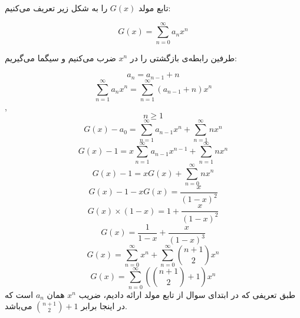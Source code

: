     \p
    تابع مولد $G(x)$ را به شکل زیر تعریف می‌کنیم:
    
    $$G(x) = \sum_{n = 0}^{\infty} a_nx^n$$
    
    طرفین رابطه‌ی بازگشتی را در $x^n$ ضرب می‌کنیم و سیگما می‌گیریم:
    

        $$a_n = a_{n-1} + n$$
        $$\sum_{n = 1}^{\infty} a_nx^n = \sum_{n = 1}^{\infty} (a_{n-1}+n)x^n$$
        ,
        $$ n \geqslant 1 $$
        $$G(x) - a_0 = \sum_{n = 1}^{\infty} a_{n-1}x^n + \sum_{n = 1}^{\infty}nx^n$$
        $$G(x) - 1 = x\sum_{n = 1}^{\infty} a_{n-1}x^{n-1} + \sum_{n = 1}^{\infty}nx^n$$
        $$G(x) - 1 = xG(x) + \sum_{n = 0}^{\infty}nx^n$$
        $$G(x) - 1 - xG(x) = \frac{x}{(1 - x)^2}$$
        $$G(x)\times(1 - x) = 1 + \frac{x}{(1 - x)^2}$$
        $$G(x) = \frac{1}{1 - x} + \frac{x}{(1 - x)^3}$$
        $$G(x) = \sum_{n = 0}^{\infty} x^n + \sum_{n = 0}^{\infty} \binom{n + 1}{2}x^n$$
        $$G(x) = \sum_{n = 0}^{\infty} (\binom{n + 1}{2} + 1)x^n$$
    طبق تعریفی که در ابتدای سوال از تابع مولد ارائه دادیم، ضریب $x^n$ همان $a_n$ است
    که در اینجا برابر
    $\binom{n + 1}{2} + 1$
    می‌باشد.